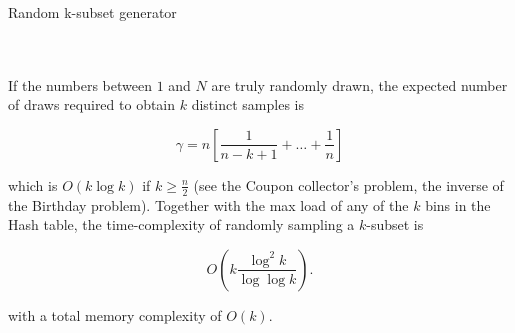 \documentclass[10pt,usenames,dvipsnames]{article}
\newenvironment{exercise}[2][Exercise]{\begin{trivlist}
  \item[\hskip \labelsep {\bfseries #1}\hskip \labelsep {\bfseries #2.}]}{\end{trivlist}}
\begin{document}
\begin{exercise}{1}
\begin{algorithm}[H]

 \caption{Random k-subset generator}
 \label{alg:algorithm3}
\end{algorithm}\mbox{}
 \\ \\
 
 If the numbers between $1$ and $N$ are truly randomly drawn, the expected number of
 draws required to obtain $k$ distinct samples is 

\begin{equation*}
  \gamma = n \left[ \frac{1}{n - k + 1} + \ldots + \frac{1}{n}\right]
\end{equation*}

 which is $O(k \log k)$ if $k \geq \frac{n}{2}$ (see the Coupon collector's
 problem, the inverse of the Birthday problem). Together with the
 max load of any of the $k$ bins in the Hash table, the time-complexity of
 randomly sampling a $k$-subset is

 \begin{equation*}
   O\left(k\frac{\log^2k}{\log \log k}\right).
\end{equation*}

with a total memory complexity of $O(k)$.




 



  \end{exercise}
  
\end{document}
